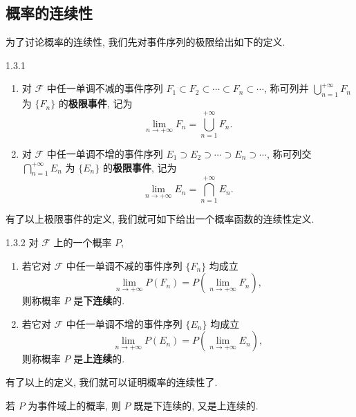 \subsection{概率的连续性}

为了讨论概率的连续性,
我们先对事件序列的极限给出如下的定义.

\begin{definition}{}{1.3.1}
  \begin{enumerate}
    \item 对 $\mathscr{F}$ 中任一单调不减的事件序列 $F_1 \subset F_2 \subset \dotsb \subset F_n \subset \dotsb$,
    称可列并 $\bigcup_{n=1}^{+\infty} F_n$ 为 $\{ F_n \}$ 的\textbf{极限事件},
    记为
    \begin{equation}
      \lim_{n \to +\infty} F_n = \bigcup_{n=1}^{+\infty} F_n.
      \label{eq1.3.9}
    \end{equation}

    \item 对 $\mathscr{F}$ 中任一单调不增的事件序列 $E_1 \supset E_2 \supset \dotsb \supset E_n \supset \dotsb$,
    称可列交 $\bigcap_{n=1}^{+\infty} E_n$ 为 $\{ E_n \}$ 的\textbf{极限事件},
    记为
    \begin{equation}
      \lim _{n \to +\infty} E _n = \bigcap _{n=1} ^{+\infty} E_n.
      \label{eq1.3.10}
    \end{equation}
  \end{enumerate}
\end{definition}

有了以上极限事件的定义,
我们就可如下给出一个概率函数的连续性定义.

\begin{definition}{}{1.3.2}
  对 $\mathscr{F}$ 上的一个概率 $P$,
  \begin{enumerate}
    \item 若它对 $\mathscr{F}$ 中任一单调不减的事件序列 $\{F_n\}$ 均成立
    \[
      \lim _{n \to +\infty} P (F_n) = P (\lim _{n \to +\infty} F_n),
    \]
    则称概率 $P$ 是\textbf{下连续}的.

    \item 若它对 $\mathscr{F}$ 中任一单调不增的事件序列 $\{E_n\}$ 均成立
    \[
      \lim _{n \to +\infty} P (E_n) = P (\lim _{n \to +\infty} E_n),
    \]
    则称概率 $P$ 是\textbf{上连续}的.
  \end{enumerate}
\end{definition}

有了以上的定义,
我们就可以证明概率的连续性了.

\begin{property}[概率的连续性]\label{prop1.3.7}
  若 $P$ 为事件域上的概率,
  则 $P$ 既是下连续的,
  又是上连续的.
\end{property}

